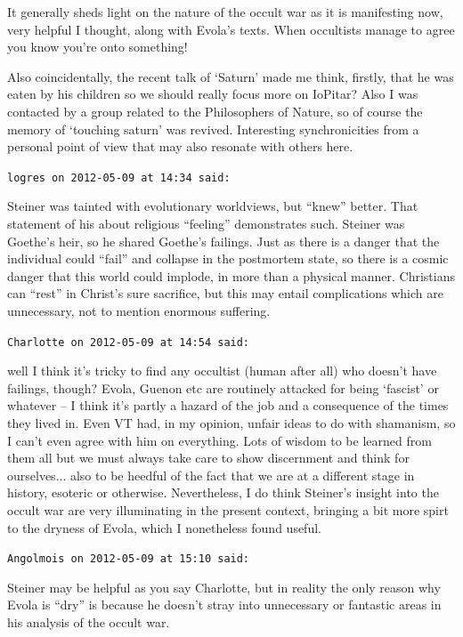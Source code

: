 \begin{footnotesize}
\begin{sffamily}
It generally sheds light on the nature of the occult war as it is manifesting now, very helpful I thought, along with Evola's texts. When occultists manage to agree you know you're onto something!

Also coincidentally, the recent talk of `Saturn' made me think, firstly, that he was eaten by his children so we should really focus more on IoPitar? Also I was contacted by a group related to the Philosophers of Nature, so of course the memory of `touching saturn' was revived. Interesting synchronicities from a personal point of view that may also resonate with others here.

\hfill

\texttt{logres on 2012-05-09 at 14:34 said:}

Steiner was tainted with evolutionary worldviews, but ``knew'' better. That statement of his about religious ``feeling'' demonstrates such. Steiner was Goethe's heir, so he shared Goethe's failings. Just as there is a danger that the individual could ``fail'' and collapse in the postmortem state, so there is a cosmic danger that this world could implode, in more than a physical manner. Christians can ``rest'' in Christ's sure sacrifice, but this may entail complications which are unnecessary, not to mention enormous suffering.

\hfill

\texttt{Charlotte on 2012-05-09 at 14:54 said:}

well I think it's tricky to find any occultist (human after all) who doesn't have failings, though? Evola, Guenon etc are routinely attacked for being `fascist' or whatever -- I think it's partly a hazard of the job and a consequence of the times they lived in. Even VT had, in my opinion, unfair ideas to do with shamanism, so I can't even agree with him on everything. Lots of wisdom to be learned from them all but we must always take care to show discernment and think for ourselves... also to be heedful of the fact that we are at a different stage in history, esoteric or otherwise. Nevertheless, I do think Steiner's insight into the occult war are very illuminating in the present context, bringing a bit more spirt to the dryness of Evola, which I nonetheless found useful.

\hfill

\texttt{Angolmois on 2012-05-09 at 15:10 said:}

Steiner may be helpful as you say Charlotte, but in reality the only reason why Evola is ``dry'' is because he doesn't stray into unnecessary or fantastic areas in his analysis of the occult war.


\end{sffamily}
\end{footnotesize}

